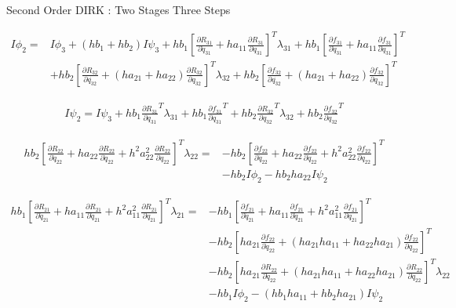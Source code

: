 \documentclass{beamer}
\newcommand{\pd}[2]{\frac{\partial #1}{\partial #2}}
\begin{document}
\begin{frame}[allowframebreaks]{Second Order DIRK : Two Stages Three Steps}
\framebreak

\begin{equation}
  \begin{split}
    I \phi_2 = & I \phi_3 + (hb_1 + hb_2) I \psi_3  + hb_1 \left[ \pd{R_{31}}{\dot{q}_{31}} + ha_{11} \pd{R_{31}}{q_{31}}  \right]^T \lambda_{31} + hb_1 \left[ \pd{f_{31}}{\dot{q}_{31}} + ha_{11} \pd{f_{31}}{{q}_{31}} \right]^T \\
               & + hb_2 \left[ \pd{R_{32}}{\dot{q_{32}}} + (ha_{21} + ha_{22}) \pd{R_{32}}{q_{32}} \right]^T \lambda_{32} + hb_2 \left[ \pd{f_{32}}{\dot{q_{32}}} + (ha_{21} + ha_{22}) \pd{f_{32}}{q_{32}} \right]^T               
  \end{split}
\end{equation}

\begin{equation}
  \begin{split}
    I \psi_2 = I \psi_3 + hb_1 \pd{R_{31}}{q_{31}}^T \lambda_{31} + hb_1 \pd{f_{31}}{q_{31}}^T  + hb_2 \pd{R_{32}}{q_{32}}^T \lambda_{32} + hb_2 \pd{f_{32}}{q_{32}}^T
  \end{split}
\end{equation}


\begin{equation}
  \begin{split}
    hb_2\left[\pd{R_{22}}{\ddot{q}_{22}} + ha_{22}\pd{R_{22}}{\dot{q}_{22}} + h^2a_{22}^2 \pd{R_{22}}{{q}_{22}} \right]^T \lambda_{22} = & - hb_2 \left[\pd{f_{22}}{\ddot{q}_{22}} + ha_{22}\pd{f_{22}}{\dot{q}_{22}} + h^2a_{22}^2 \pd{f_{22}}{{q}_{22}} \right]^T \\ 
    & - hb_2 I \phi_2 - hb_2 ha_{22} I  \psi_2
  \end{split}
\end{equation}

\begin{equation}
  \begin{split}
    hb_1\left[\pd{R_{21}}{\ddot{q}_{21}} + ha_{11}\pd{R_{21}}{\dot{q}_{21}} + h^2a_{11}^2 \pd{R_{21}}{{q}_{21}} \right]^T \lambda_{21} = & - hb_1 \left[\pd{f_{21}}{\ddot{q}_{21}} + ha_{11}\pd{f_{21}}{\dot{q}_{21}} + h^2a_{11}^2 \pd{f_{21}}{{q}_{21}} \right]^T \\ 
    & - hb_2 \left[ha_{21}\pd{f_{22}}{\dot{q}_{22}} + (ha_{21}ha_{11} + ha_{22}ha_{21}) \pd{f_{22}}{{q}_{22}} \right]^T \\
    & - hb_2 \left[ha_{21}\pd{R_{22}}{\dot{q}_{22}} + (ha_{21}ha_{11} + ha_{22}ha_{21}) \pd{R_{22}}{{q}_{22}} \right]^T\lambda_{22} \\
    & - hb_1I \phi_2  - (hb_1ha_{11} + hb_2ha_{21}) I \psi_2
  \end{split}
\end{equation}

\end{frame}
\end{document}
